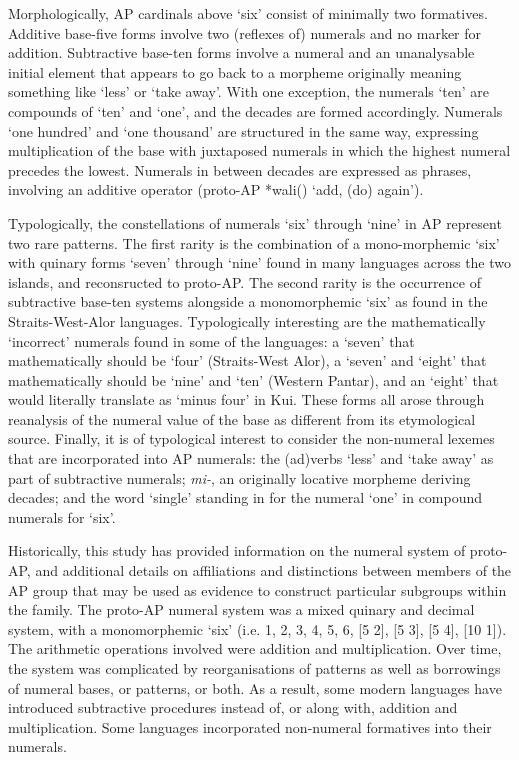 Morphologically, AP cardinals above `six' consist of minimally two formatives. Additive base-five forms involve two (reflexes of) numerals and no marker for addition. Subtractive base-ten forms involve a numeral and an unanalysable initial element that appears to go back to a morpheme originally meaning something like `less' or `take away'. With one exception, the numerals `ten' are compounds of `ten' and `one', and the decades are formed accordingly. Numerals `one hundred' and `one thousand' are structured in the same way, expressing multiplication of the base with juxtaposed numerals in which the highest numeral precedes the lowest. Numerals in between decades are expressed as phrases, involving an additive operator (proto-AP *wali({\ng}) `add, (do) again'). 

Typologically, the constellations of numerals `six' through `nine' in AP represent two rare patterns. The first rarity is the combination of a mono-morphemic `six' with quinary forms `seven' through `nine' found in many languages across the two islands, and reconsructed to proto-AP. The second rarity is the occurrence of subtractive base-ten systems alongside a monomorphemic `six' as found in the Straits-West-Alor languages. Typologically interesting are the mathematically `incorrect' numerals found in some of the languages: a `seven' that mathematically should be `four' (Straits-West Alor), a `seven' and `eight' that mathematically should be `nine' and `ten' (Western Pantar), and an `eight' that would literally translate as `minus four' in Kui. These forms all arose through reanalysis of the numeral value of the base as different from its etymological source. Finally, it is of typological interest to consider the non-numeral lexemes that are incorporated into AP numerals: the (ad)verbs `less' and `take away' as part of subtractive numerals;      \textit{mi-}, an originally locative morpheme deriving decades; and the word `single' standing in for the numeral `one' in compound numerals for `six'. 

Historically, this study has provided information on the numeral system of proto-AP, and additional details on affiliations and distinctions between members of the AP group that may be used as evidence to construct particular subgroups within the family. The proto-AP numeral system was a mixed quinary and decimal system, with a monomorphemic `six' (i.e. 1, 2, 3, 4, 5, 6, [5 2], [5 3], [5 4], [10 1]). The arithmetic operations involved were addition and multiplication. Over time, the system was complicated by reorganisations of patterns as well as borrowings of numeral bases, or patterns, or both. As a result, some modern languages have introduced subtractive procedures instead of, or along with, addition and multiplication. Some languages incorporated non-numeral formatives into their numerals. 

